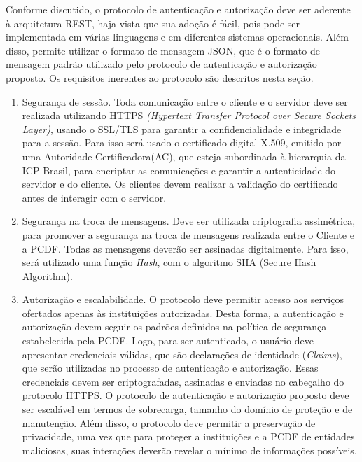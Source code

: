 Conforme discutido, o protocolo de autenticação e autorização deve ser aderente à arquitetura REST, haja vista que sua adoção é fácil, pois pode ser implementada em várias linguagens e em diferentes sistemas operacionais.  Além disso, permite utilizar o formato de mensagem JSON, que é o formato de mensagem padrão utilizado pelo protocolo de autenticação e autorização proposto. Os requisitos inerentes ao protocolo são descritos nesta seção.

\begin{enumerate}[RQ1]

\item Segurança de sessão. Toda comunicação entre o cliente e o servidor deve ser realizada utilizando HTTPS
\emph{(Hypertext Transfer Protocol over Secure Sockets Layer)}, usando o SSL/TLS para garantir a confidencialidade
e integridade para a sessão. Para isso será usado o certificado digital X.509, emitido por uma Autoridade Certificadora(AC), que esteja subordinada à hierarquia da ICP-Brasil, para encriptar as comunicações e garantir a autenticidade do servidor e do cliente. Os clientes devem realizar a validação do certificado antes de interagir com o servidor.

\item Segurança na troca de mensagens. Deve ser utilizada criptografia assimétrica, para promover a segurança na troca de mensagens realizada entre o Cliente e a PCDF. Todas as mensagens deverão ser assinadas digitalmente. Para isso, será utilizado uma função \emph{Hash}, com o algoritmo SHA (Secure Hash Algorithm).

\item Autorização e escalabilidade. O protocolo deve permitir acesso aos serviços ofertados apenas às instituições autorizadas. Desta forma, a autenticação e autorização devem seguir os padrões definidos na política de segurança estabelecida pela PCDF. Logo, para ser autenticado, o usuário deve apresentar credenciais válidas, que são declarações de identidade (\emph{Claims}), que serão utilizadas no processo de autenticação e autorização. Essas credenciais devem ser criptografadas, assinadas e enviadas no cabeçalho do protocolo HTTPS.
    O protocolo de autenticação e autorização proposto deve ser escalável em termos de sobrecarga, tamanho do domínio de proteção e de manutenção. Além disso, o protocolo deve permitir a preservação de privacidade, uma vez que para proteger a instituições e a PCDF de entidades maliciosas, suas interações deverão revelar o mínimo de informações possíveis.


\end{enumerate}
